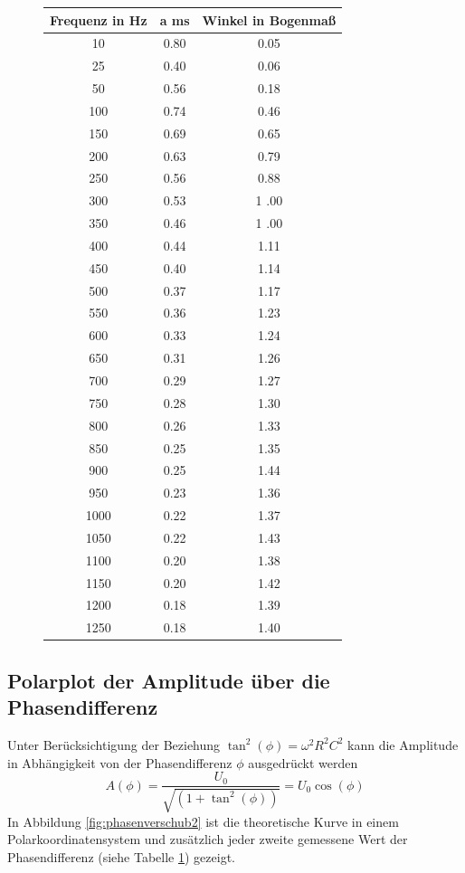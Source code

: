 \begin{figure}[h!]
	\centering
	\begin{tabular}{c|c|c}
	Frequenz in \si{\hertz}& a \si{\milli\second} & Winkel in Bogenmaß\\
		\hline
		10 & 0.80  & 0.05 \\
		25 & 0.40  & 0.06 \\
		50 & 0.56 & 0.18 \\
		100 & 0.74 & 0.46 \\
		150 & 0.69 & 0.65 \\
		200 & 0.63 & 0.79 \\
		250 & 0.56 & 0.88 \\
		300 & 0.53 & 1 .00   \\
		350 & 0.46 & 1 .00   \\
		400 & 0.44 & 1.11 \\
		450 & 0.40  & 1.14 \\
		500 & 0.37 & 1.17 \\
		550 & 0.36 & 1.23 \\
		600 & 0.33 & 1.24 \\
		650 & 0.31 & 1.26 \\
		700 & 0.29 & 1.27 \\
		750 & 0.28 & 1.30  \\
		800 & 0.26 & 1.33 \\
		850 & 0.25 & 1.35 \\
		900 & 0.25 & 1.44 \\
		950 & 0.23 & 1.36 \\
		1000 & 0.22 & 1.37 \\
		1050 & 0.22 & 1.43 \\
		1100 & 0.20  & 1.38 \\
		1150 & 0.20 & 1.42 \\
		1200 & 0.18 & 1.39 \\
		1250 & 0.18 & 1.40 
	\end{tabular}
	\label{tab:phasenverschub}
\end{figure}

\clearpage
\subsection{Polarplot der Amplitude über die Phasendifferenz}
Unter Berücksichtigung der Beziehung $\tan^2(\phi) = \omega ^2 R^2 C^2$ kann die Amplitude in Abhängigkeit von der Phasendifferenz $\phi$ ausgedrückt werden
\begin{equation}
A(\phi) = \frac{U_0}{\sqrt{(1+\tan^2(\phi))}} = U_0 \cos(\phi)
\end{equation}
In Abbildung \ref{fig:phasenverschub2} ist die theoretische Kurve in einem Polarkoordinatensystem und zusätzlich jeder zweite gemessene Wert der Phasendifferenz (siehe Tabelle \ref{tab:phasenverschub}) gezeigt.

